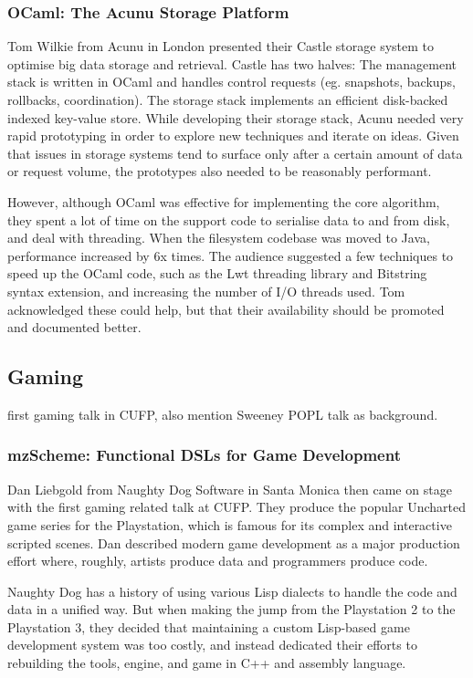 \documentclass{jfp1}
\begin{document}
\subsubsection{OCaml: The Acunu Storage Platform}

Tom Wilkie from Acunu in London presented their Castle storage system to
optimise big data storage and retrieval. Castle has two halves: The management stack 
is written in OCaml and handles control requests (eg. snapshots, backups, rollbacks, 
coordination). The storage stack implements an efficient disk-backed indexed key-value
store. While developing their storage stack, Acunu needed very rapid prototyping in order
to explore new techniques and iterate on ideas. Given that issues in storage systems tend
to surface only after a certain amount of data or request volume, the prototypes also needed
to be reasonably performant.

However, although OCaml was effective for implementing the core algorithm, they
spent a lot of time on the support code to serialise data to and from disk, and
deal with threading. When the filesystem codebase was moved to Java,
performance increased by 6x times. The audience suggested a few techniques to
speed up the OCaml code, such as the Lwt threading library and Bitstring syntax
extension, and increasing the number of I/O threads used. Tom acknowledged
these could help, but that their availability should be promoted and documented
better. 

\subsection{Gaming}

first gaming talk in CUFP, also mention Sweeney POPL talk as background.

\subsubsection{mzScheme: Functional DSLs for Game Development}

Dan Liebgold from Naughty Dog Software in Santa Monica then came on stage with
the first gaming related talk at CUFP. They produce the popular Uncharted game
series for the Playstation, which is famous for its complex and interactive
scripted scenes.  Dan described modern game development as a major production 
effort where, roughly, artists produce data and programmers produce code.

Naughty Dog has a history of using various Lisp dialects to handle the code and
data in a unified way. But when making the jump from the Playstation 2 to the
Playstation 3, they decided that maintaining a custom Lisp-based game
development system was too costly, and instead dedicated their efforts to
rebuilding the tools, engine, and game in C++ and assembly language.
\end{document}
